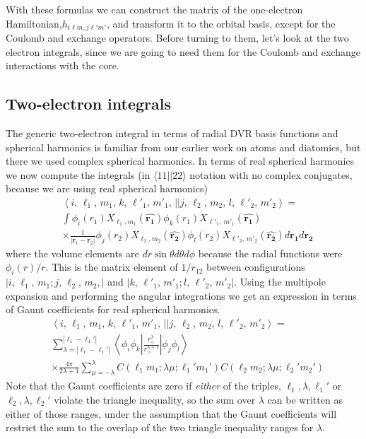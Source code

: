 \documentclass[%
pra%
,twocolumn%
,amssymb, nobibnotes, aps,
longbibliography
]{revtex4-1}
\begin{document}
With these formulas we can construct the matrix of the one-electron Hamiltonian,$h_{i \ell m, j \ell' m'}$, and transform it to the orbital basis, except for the Coulomb and exchange operators.   Before turning to them, let's look at the two electron integrals, since we are going to need them for the Coulomb and exchange interactions with the core.

\subsection{Two-electron integrals}

The generic two-electron integral in terms of radial DVR 
basis functions and spherical harmonics is familiar from our earlier work on atoms and diatomics, but there we 
used complex spherical harmonics.  In terms of real spherical harmonics we now compute the integrals (in $\langle 1 1|| 22 \rangle$ notation 
with no complex conjugates, because we are using real spherical harmonics)
\begin{equation}
\begin{split}
&\left< 
i ,\, \ell_1, \, m_1, \, k ,\, \ell'_1, \, m'_1, \, ||
j, \,\ell_2, \, m_2, \,  l, \,\ell'_2, \, m'_2 \right>
 = \\
&\int 
\phi_{i}(r_1)X_{\ell_1,m_1} (\mathbf{\hat{r_1}})
\phi_{k}(r_1)X_{ \ell'_1, \, m'_1} (\mathbf{\hat{r_1}})
\\
& \times
\frac{1}{|\mathbf{r}_1-\mathbf{r}_2|}
 \phi_{j}(r_2) X_{\ell_2,m_2} (\mathbf{\hat{r_2}}) 
\phi_{l}(r_2) X_{\ell'_2, \, m'_2 } (\mathbf{\hat{r_2}})
d\mathbf{r_1}
d\mathbf{r_2}
\end{split}
\end{equation}
where the volume elements are $dr \sin \theta d\theta d\phi$ because the radial functions were $\phi_i(r)/r$.
This is the matrix element of $1/r_{12}$ between configurations $|i ,\, \ell_1, \, m_1;j, \,\ell_2, \, m_2,|$ and $|  k ,\, \ell'_1, \, m'_1; l, \,\ell'_2, \, m'_2 |$.
Using the multipole expansion and performing the angular 
integrations we get an expression in terms of Gaunt coefficients for real spherical harmonics.
\begin{equation}
\begin{split}
&\left< 
i ,\, \ell_1, \, m_1, \, k ,\, \ell'_1, \, m'_1, \, ||
j, \,\ell_2, \, m_2, \,  l, \,\ell'_2, \, m'_2 \right>
 = \\
& \sum_{\lambda=|\ell_1-\ell_1'|}^{|\ell_1-\ell_1'|}
 \left< \phi_{i} \phi_{k}|\frac{r_<^\lambda}{r_>^{\lambda+1}}| 
\phi_{j}\phi_{l}\right> \\
& \times \frac{4\pi} {2\lambda+1} 
\sum_{\mu=-\lambda}^{\lambda} 
 C(\ell_1 m_1;\lambda \mu ;\ell_1' m_1') 
 C(\ell_2 m_2;\lambda \mu ;\ell_2' m_2') 
\end{split}
\end{equation}
Note that the Gaunt coefficients are zero if \textit{either} of the triples, $\ell_1,\lambda,\ell_1'$ or $\ell_2,\lambda,\ell_2'$ violate the triangle inequality, so the sum over $\lambda$ can be written as either of those ranges, under the assumption that the Gaunt coefficients will restrict the sum to the overlap of the two triangle inequality ranges for $\lambda$.
\end{document}
